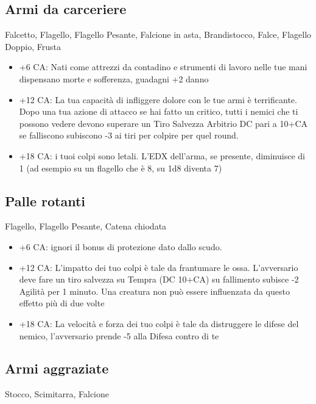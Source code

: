 \documentclass[a4paper,11pt,twoside,openany]{book}
\begin{document}
\subsection{Armi da carceriere} Falcetto, Flagello, Flagello Pesante, Falcione in asta, Brandistocco, Falce, Flagello Doppio, Frusta

\begin{itemize}
\item +6 CA: Nati come attrezzi da contadino e strumenti di lavoro nelle tue mani dispensano morte e sofferenza, guadagni +2 danno

\item +12 CA: La tua capacità di infliggere dolore con le tue armi è terrificante. Dopo una tua azione di attacco se hai fatto un critico, tutti i nemici che ti possono vedere devono superare un Tiro Salvezza Arbitrio DC pari a 10+CA se falliscono subiscono -3 ai tiri per colpire per quel round.

\item +18 CA: i tuoi colpi sono letali. L'EDX dell'arma, se presente, diminuisce di 1 (ad esempio su un flagello che è 8, su 1d8 diventa 7)
\end{itemize}

\subsection{Palle rotanti} Flagello, Flagello Pesante, Catena chiodata

\begin{itemize}
\item +6 CA: ignori il bonus di protezione dato dallo scudo.

\item +12 CA: L'impatto dei tuo colpi è tale da frantumare le ossa. L'avversario deve fare un tiro salvezza su Tempra (DC 10+CA) su fallimento subisce -2 Agilità per 1 minuto. Una creatura non può essere influenzata da questo effetto più di due volte

\item +18 CA: La velocità e forza dei tuo colpi è tale da distruggere le difese del nemico, l'avversario prende -5 alla Difesa contro di te 
\end{itemize}

\subsection{Armi aggraziate} Stocco, Scimitarra, Falcione
\end{document}
